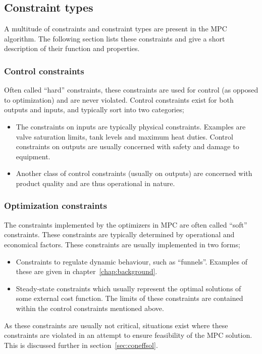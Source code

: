 \subsection{Constraint types}
A multitude of constraints and constraint types are present in the MPC algorithm.
The following section lists these constraints and give a short description of their function and properties.
\subsubsection{Control constraints}
Often called ``hard'' constraints, these constraints are used for control (as opposed to optimization) and are never violated.
Control constraints exist for both outputs and inputs, and typically sort into two categories;
\begin{itemize}
  \item The constraints on inputs are typically physical constraints.
    Examples are valve saturation limits, tank levels and maximum heat      duties.
    Control constraints on outputs are usually concerned with safety and damage to equipment.
  \item Another class of control constraints (usually on outputs) are concerned with product quality and are thus operational in nature.
\end{itemize}

\subsubsection{Optimization constraints}
The constraints implemented by the optimizers in MPC are often called ``soft'' constraints.
These constraints are typically determined by operational and economical factors.
These constraints are usually implemented in two forms;
\begin{itemize}
\item Constraints to regulate dynamic behaviour, such as ``funnels''.
Examples of these are given in chapter~\ref{chap:background}.
\item Steady-state constraints which usually represent the optimal solutions of some external cost function.
The limits of these constraints are contained within the control constraints mentioned above.
\end{itemize}
As these constraints are usually not critical, situations exist where these constraints are violated in an attempt to ensure feasibility of the MPC solution.
This is discussed further in section~\ref{sec:coneffsol}.
 
